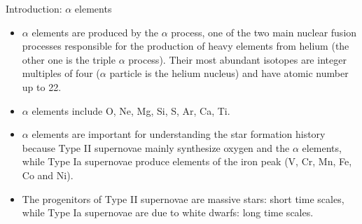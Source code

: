 \documentclass[letterpaper,landscape]{slides}
\begin{document}
\begin{slide}
\begin{center}
{\large \color{red} Introduction: $\alpha$ elements}
\end{center}

\begin{itemize}
\item
$\alpha$ elements are produced by the $\alpha$ process, one of the two main nuclear fusion 
processes responsible for the production of heavy elements from helium (the other one is the 
triple $\alpha$ process). Their most abundant isotopes are integer multiples of four 
($\alpha$ particle is the helium nucleus) and have atomic number up to 22.
\item
$\alpha$ elements include O, Ne, Mg, Si, S, Ar, Ca, Ti. 
\item 
$\alpha$ elements are important for understanding the star formation history because 
Type II supernovae mainly synthesize oxygen and the $\alpha$ elements, 
while Type Ia 
supernovae produce elements of the iron peak (V, Cr, Mn, Fe, Co and Ni). 
\item
The progenitors of Type II supernovae are massive stars: short time scales, while
Type Ia supernovae are due to white dwarfs: long time scales. 
\end{itemize}  

\vfill
\end{slide}
\end{document}
